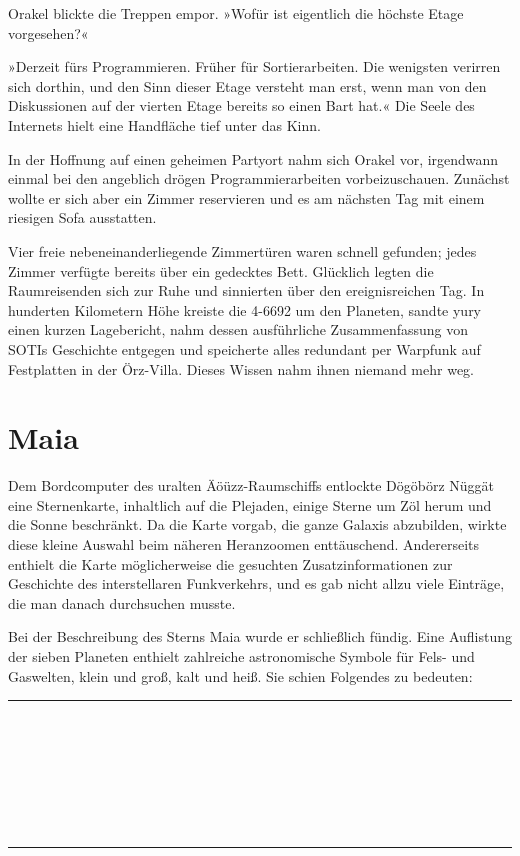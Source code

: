Orakel blickte die Treppen empor. »Wofür ist eigentlich die höchste Etage vorgesehen?«

»Derzeit fürs Programmieren. Früher für Sortierarbeiten. Die wenigsten verirren sich dorthin, und den Sinn dieser Etage versteht man erst, wenn man von den Diskussionen auf der vierten Etage bereits so einen Bart hat.« Die Seele des Internets hielt eine Handfläche tief unter das Kinn.

In der Hoffnung auf einen geheimen Partyort nahm sich Orakel vor, irgendwann einmal bei den angeblich drögen Programmierarbeiten vorbeizuschauen. Zunächst wollte er sich aber ein Zimmer reservieren und es am nächsten Tag mit einem riesigen Sofa ausstatten.

Vier freie nebeneinanderliegende Zimmertüren waren schnell gefunden; jedes Zimmer verfügte bereits über ein gedecktes Bett. Glücklich legten die Raumreisenden sich zur Ruhe und sinnierten über den ereignisreichen Tag. In hunderten Kilometern Höhe kreiste die 4-6692 um den Planeten, sandte yury einen kurzen Lagebericht, nahm dessen ausführliche Zusammenfassung von SOTIs Geschichte entgegen und speicherte alles redundant per Warpfunk auf Festplatten in der Örz-Villa. Dieses Wissen nahm ihnen niemand mehr weg.


\chapter{Maia}

Dem Bordcomputer des uralten Äöüzz-Raumschiffs entlockte Dögöbörz Nüggät eine Sternenkarte, inhaltlich auf die Plejaden, einige Sterne um Zöl herum und die Sonne beschränkt. Da die Karte vorgab, die ganze Galaxis abzubilden, wirkte diese kleine Auswahl beim näheren Heranzoomen enttäuschend. Andererseits enthielt die Karte möglicherweise die gesuchten Zusatzinformationen zur Geschichte des interstellaren Funkverkehrs, und es gab nicht allzu viele Einträge, die man danach durchsuchen musste.

Bei der Beschreibung des Sterns Maia wurde er schließlich fündig. Eine Auflistung der sieben Planeten enthielt zahlreiche astronomische Symbole für Fels- und Gaswelten, klein und groß, kalt und heiß. Sie schien Folgendes zu bedeuten:

\noindent \parbox{\textwidth}{ \vspace{3ex} \hrule \vspace{3ex}


\noindent{}\\
\noindent{}\\
\noindent{}\\
\noindent{}\\
\noindent{}\\
\noindent{}\\
\noindent{}

\vspace{3ex} \hrule \vspace{3ex} }

